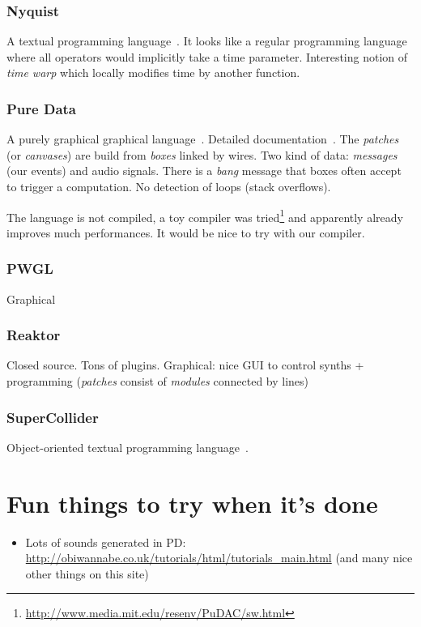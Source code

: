 \documentclass[a4paper,titlepage]{article}
\begin{document}
\subsubsection{Nyquist}
A textual programming language~\cite{nyquist}. It looks like a regular
programming language where all operators would implicitly take a time
parameter. Interesting notion of \emph{time warp} which locally modifies time by
another function.


\subsubsection{Pure Data}
A purely graphical graphical language~\cite{puredata}. Detailed
documentation~\cite{pd-doc}. The \emph{patches} (or \emph{canvases}) are build
from \emph{boxes} linked by wires. Two kind of data: \emph{messages} (our
events) and audio signals. There is a \emph{bang} message that boxes often
accept to trigger a computation. No detection of loops (stack overflows).

The language is not compiled, a toy compiler was
tried\footnote{\url{http://www.media.mit.edu/resenv/PuDAC/sw.html}} and
apparently already improves much performances. It would be nice to try with our compiler.

\subsubsection{PWGL}
\cite{pwgl}
Graphical

\subsubsection{Reaktor}
\cite{reaktor} Closed source. Tons of plugins. Graphical: nice GUI to control
synths + programming (\emph{patches} consist of \emph{modules} connected by
lines)

\subsubsection{SuperCollider}
Object-oriented textual programming language~\cite{supercollider}.

\section{Fun things to try when it's done}
\begin{itemize}
\item Lots of sounds generated in PD:
  \url{http://obiwannabe.co.uk/tutorials/html/tutorials_main.html}
  (and many nice other things on this site)
\end{itemize}



\end{document}
